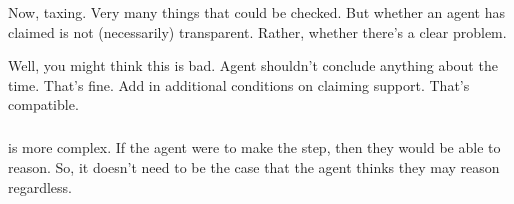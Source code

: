 \begin{note}
  Now, taxing.
  Very many things that could be checked.
  But whether an agent has claimed \support{} is not (necessarily) transparent.
  Rather, whether there's a clear problem.
\end{note}

\begin{note}
  Well, you might think this is bad.
  Agent shouldn't conclude anything about the time.
  That's fine.
  Add in additional conditions on claiming support.
  That's compatible.
\end{note}

\subparagraph{\crequ{}}

\begin{note}[\crequ{}]
  \crequ{} is more complex.
  If the agent were to make the step, then they would be able to reason.
  So, it doesn't need to be the case that the agent thinks they may reason regardless.
\end{note}

